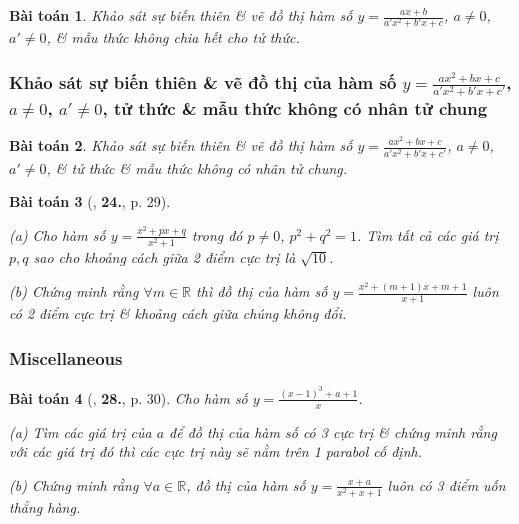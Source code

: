 \documentclass[12pt]{article}
\numberwithin{equation}{section}
\newtheorem{baitoan}{Bài toán}[section]
\begin{document}
\begin{baitoan}
	Khảo sát sự biến thiên \& vẽ đồ thị hàm số $y = \frac{ax + b}{a'x^2 + b'x + c}$, $a\ne 0$, $a'\ne 0$, \& mẫu thức không chia hết cho tử thức.
\end{baitoan}

\subsubsection{Khảo sát sự biến thiên \& vẽ đồ thị của hàm số $y = \frac{ax^2 + bx + c}{a'x^2 + b'x + c'}$, $a\ne 0$, $a'\ne 0$, tử thức \& mẫu thức không có nhân tử chung}

\begin{baitoan}
	Khảo sát sự biến thiên \& vẽ đồ thị hàm số $y = \frac{ax^2 + bx + c}{a'x^2 + b'x + c'}$, $a\ne 0$, $a'\ne 0$, \& tử thức \& mẫu thức không có nhân tử chung.
\end{baitoan}

\begin{baitoan}[\cite{TL_chuyen_Toan_Giai_Tich_12}, \textbf{24.}, p. 29]
	\begin{enumerate*}
		\item[(a)] Cho hàm số $y = \frac{x^2 + px + q}{x^2 + 1}$ trong đó $p\ne 0$, $p^2 + q^2 = 1$. Tìm tất cả các giá trị $p,q$ sao cho khoảng cách giữa 2 điểm cực trị là $\sqrt{10}$.
		\item[(b)] Chứng minh rằng $\forall m\in\mathbb{R}$ thì đồ thị của hàm số $y = \frac{x^2 + (m + 1)x + m + 1}{x + 1}$ luôn có 2 điểm cực trị \& khoảng cách giữa chúng không đổi.
	\end{enumerate*}
\end{baitoan}

\subsubsection{Miscellaneous}

\begin{baitoan}[\cite{TL_chuyen_Toan_Giai_Tich_12}, \textbf{28.}, p. 30]
	Cho hàm số $y = \frac{(x - 1)^3 + a + 1}{x}$.
	\begin{enumerate*}
		\item[(a)] Tìm các giá trị của $a$ để đồ thị của hàm số có 3 cực trị \& chứng minh rằng với các giá trị đó thì các cực trị này sẽ nằm trên 1 parabol cố định.
		\item[(b)] Chứng minh rằng $\forall a\in\mathbb{R}$, đồ thị của hàm số $y = \frac{x + a}{x^2 + x + 1}$ luôn có 3 điểm uốn thẳng hàng.
	\end{enumerate*}
\end{baitoan}
	
\end{document}

